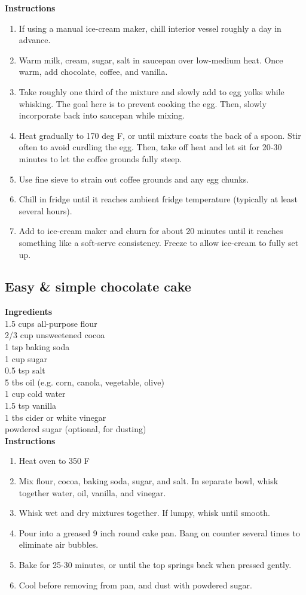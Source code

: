 \documentclass{article}
\numberwithin{figure}{section}
\numberwithin{equation}{section}
\begin{document}
{\bf Instructions}
\begin{enumerate}
\item If using a manual ice-cream maker, chill interior vessel roughly a day in advance. 
\item Warm milk, cream, sugar, salt in saucepan over low-medium heat. Once warm, add chocolate, coffee, and vanilla.
\item Take roughly one third of the mixture and slowly add to egg yolks while whisking. The goal here is to prevent cooking the egg. Then, slowly incorporate back into saucepan while mixing. 
\item Heat gradually to 170 deg F, or until mixture coats the back of a spoon. Stir often to avoid curdling the egg. Then, take off heat and let sit for 20-30 minutes to let the coffee grounds fully steep.
\item Use fine sieve to strain out coffee grounds and any egg chunks.
\item Chill in fridge until it reaches ambient fridge temperature (typically at least several hours).
\item Add to ice-cream maker and churn for about 20 minutes until it reaches something like a soft-serve consistency. Freeze to allow ice-cream to fully set up.
\end{enumerate}


\pagebreak
\subsection{Easy \& simple chocolate cake}
{\bf Ingredients}\\
1.5 cups all-purpose flour\\
2/3 cup unsweetened cocoa\\
1 tsp baking soda\\
1 cup sugar\\
0.5 tsp salt\\
5 tbs oil (e.g. corn, canola, vegetable, olive)\\
1 cup cold water\\
1.5 tsp vanilla\\
1 tbs cider or white vinegar\\
powdered sugar (optional, for dusting)\\

{\bf Instructions}
\begin{enumerate}
\item Heat oven to 350 F
\item Mix flour, cocoa, baking soda, sugar, and salt. In separate bowl, whisk together water, oil, vanilla, and vinegar.
\item Whisk wet and dry mixtures together. If lumpy, whisk until smooth.
\item Pour into a greased 9 inch round cake pan. Bang on counter several times to eliminate air bubbles.
\item Bake for 25-30 minutes, or until the top springs back when pressed gently.
\item Cool before removing from pan, and dust with powdered sugar.
\end{enumerate}
\end{document}
